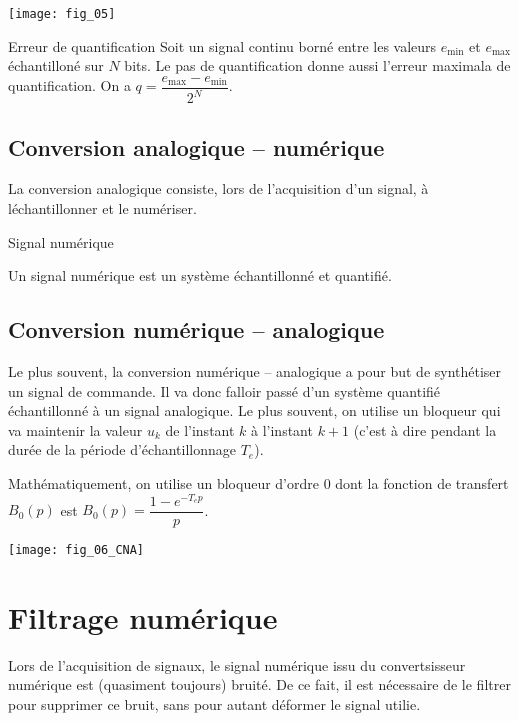 \begin{center}
\texttt{[image: fig\_05]}
\end{center}


\begin{defi}{Erreur de quantification}
Soit un signal continu borné entre les valeurs $e_{\text{min}}$ et $e_{\text{max}}$ échantilloné sur $N$ bits. Le pas de quantification donne aussi l'erreur maximala de quantification. On a $q = \dfrac{e_{\text{max}}-e_{\text{min}}}{2^N}$.

\end{defi}


\subsection{Conversion analogique -- numérique}
La conversion analogique consiste, lors de l'acquisition d'un signal, à léchantillonner et le  numériser. 
\begin{defi}{Signal numérique}

Un signal numérique est un système échantillonné et quantifié. 

\end{defi}

\subsection{Conversion numérique -- analogique}
Le plus souvent, la conversion numérique -- analogique a pour but de synthétiser un signal de commande. Il va donc falloir passé d'un système quantifié échantillonné à un signal analogique. Le plus souvent, on utilise un bloqueur qui va maintenir la valeur $u_k$ de l'instant $k$ à l'instant $k+1$ (c'est à dire pendant la durée de la période d'échantillonnage $T_e$). 

Mathématiquement, on utilise un bloqueur d'ordre 0 dont la fonction de transfert $B_0(p)$ est $B_0(p)=\dfrac{1-e^{-T_e p}}{p}$.

\begin{center}
\texttt{[image: fig\_06\_CNA]}
\end{center}

\section{Filtrage numérique}
Lors de l'acquisition de signaux, le signal numérique issu du convertsisseur numérique est (quasiment toujours) bruité. 
De ce fait, il est nécessaire de le filtrer pour supprimer ce bruit, sans pour autant déformer le signal utilie. 

